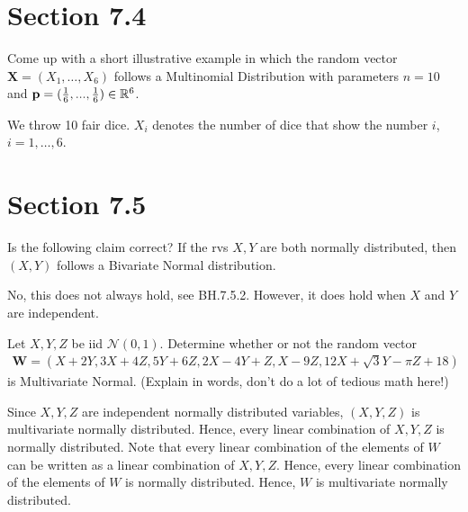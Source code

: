 \section{Section 7.4}
\label{sec:section-7.4}


\begin{exercise}
Come up with a short illustrative example in which the random vector $\mathbf{X} = (X_1, \ldots, X_6)$ follows a Multinomial Distribution with parameters  $n=10$ and $\mathbf{p}=(\frac{1}{6}, ..., \frac{1}{6}) \in \mathbb{R}^{6}$.
\begin{solution}
We throw 10 fair dice. $X_i$ denotes the number of dice that show the number $i$, $i=1,\ldots,6$.
\end{solution}
\end{exercise}


\section{Section 7.5}



\begin{exercise}
Is the following claim correct? If the rvs $X, Y$ are both normally distributed, then $(X, Y)$ follows a Bivariate Normal distribution.
\begin{solution}
No, this does not always hold, see BH.7.5.2. However, it does hold when $X$ and $Y$ are independent.
\end{solution}
\end{exercise}
\begin{exercise}
Let $X, Y, Z$ be iid $\mathcal{N}(0,1).$ Determine whether or not the random vector
\begin{align*}
    \mathbf{W} = (X+2Y, 3X+4Z, 5Y+6Z, 2X-4Y+Z, X-9Z, 12X+\sqrt{3}Y -\pi Z + 18)
\end{align*}
is Multivariate Normal. (Explain in words, don't do a lot of tedious math here!)
\begin{solution}
Since $X,Y,Z$ are independent normally distributed variables, $(X,Y,Z)$ is multivariate normally distributed. Hence, every linear combination of $X,Y,Z$ is normally distributed. Note that every linear combination of the elements of $W$ can be written as a linear combination of $X,Y,Z$. Hence, every linear combination of the elements of $W$ is normally distributed. Hence, $W$ is multivariate normally distributed.
\end{solution}
\end{exercise}




